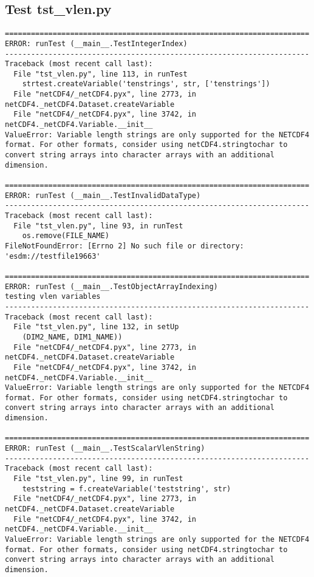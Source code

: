 \subsection{Test tst\_vlen.py}

\begin{verbatim}
======================================================================
ERROR: runTest (__main__.TestIntegerIndex)
----------------------------------------------------------------------
Traceback (most recent call last):
  File "tst_vlen.py", line 113, in runTest
    strtest.createVariable('tenstrings', str, ['tenstrings'])
  File "netCDF4/_netCDF4.pyx", line 2773, in netCDF4._netCDF4.Dataset.createVariable
  File "netCDF4/_netCDF4.pyx", line 3742, in netCDF4._netCDF4.Variable.__init__
ValueError: Variable length strings are only supported for the NETCDF4 format. For other formats, consider using netCDF4.stringtochar to convert string arrays into character arrays with an additional dimension.

======================================================================
ERROR: runTest (__main__.TestInvalidDataType)
----------------------------------------------------------------------
Traceback (most recent call last):
  File "tst_vlen.py", line 93, in runTest
    os.remove(FILE_NAME)
FileNotFoundError: [Errno 2] No such file or directory: 'esdm://testfile19663'

======================================================================
ERROR: runTest (__main__.TestObjectArrayIndexing)
testing vlen variables
----------------------------------------------------------------------
Traceback (most recent call last):
  File "tst_vlen.py", line 132, in setUp
    (DIM2_NAME, DIM1_NAME))
  File "netCDF4/_netCDF4.pyx", line 2773, in netCDF4._netCDF4.Dataset.createVariable
  File "netCDF4/_netCDF4.pyx", line 3742, in netCDF4._netCDF4.Variable.__init__
ValueError: Variable length strings are only supported for the NETCDF4 format. For other formats, consider using netCDF4.stringtochar to convert string arrays into character arrays with an additional dimension.

======================================================================
ERROR: runTest (__main__.TestScalarVlenString)
----------------------------------------------------------------------
Traceback (most recent call last):
  File "tst_vlen.py", line 99, in runTest
    teststring = f.createVariable('teststring', str)
  File "netCDF4/_netCDF4.pyx", line 2773, in netCDF4._netCDF4.Dataset.createVariable
  File "netCDF4/_netCDF4.pyx", line 3742, in netCDF4._netCDF4.Variable.__init__
ValueError: Variable length strings are only supported for the NETCDF4 format. For other formats, consider using netCDF4.stringtochar to convert string arrays into character arrays with an additional dimension.


\end{verbatim}
